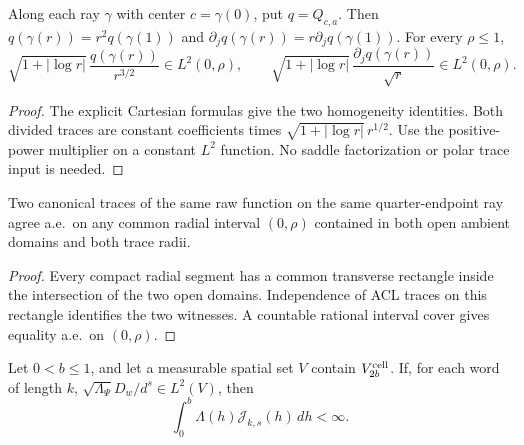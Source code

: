 \begin{lemma}
\label{lem:saddle-quadratic-ray}
\leanok
Along each ray $\gamma$ with center $c=\gamma(0)$, put $q=Q_{c,a}$.
Then $q(\gamma(r))=r^2q(\gamma(1))$ and
$\partial_jq(\gamma(r))=r\partial_jq(\gamma(1))$.
For every $\rho\le1$,
\[
 \sqrt{1+|\log r|}\,\frac{q(\gamma(r))}{r^{3/2}}\in L^2(0,\rho),
 \qquad
 \sqrt{1+|\log r|}\,\frac{\partial_jq(\gamma(r))}{\sqrt r}\in L^2(0,\rho).
\]
\end{lemma}

\begin{proof}
\leanok
The explicit Cartesian formulas give the two homogeneity identities.
Both divided traces are constant coefficients times
$\sqrt{1+|\log r|}\,r^{1/2}$.
Use the positive-power multiplier on a constant $L^2$ function.
No saddle factorization or polar trace input is needed.
\end{proof}

\begin{lemma}
\label{lem:quarter-ray-trace-unique}
\leanok
Two canonical traces of the same raw function on the same quarter-endpoint
ray agree a.e.\ on any common radial interval $(0,\rho)$ contained
in both open ambient domains and both trace radii.
\end{lemma}

\begin{proof}
\leanok
Every compact radial segment has a common transverse rectangle inside
the intersection of the two open domains. Independence of ACL traces on
this rectangle identifies the two witnesses. A countable rational
interval cover gives equality a.e.\ on $(0,\rho)$.
\end{proof}

\begin{lemma}
\label{lem:log-quarter-jet-mass}
\leanok
Let $0<b\le1$, and let a measurable spatial set $V$ contain
$V_{2b}^{\rm cell}$. If, for each word of length $k$,
$\sqrt{\Lambda_\Psi}D_w/d^s\in L^2(V)$, then
\[
 \int_0^b\Lambda(h)\mathcal J_{k,s}(h)\,dh<\infty .
\]
\end{lemma}

